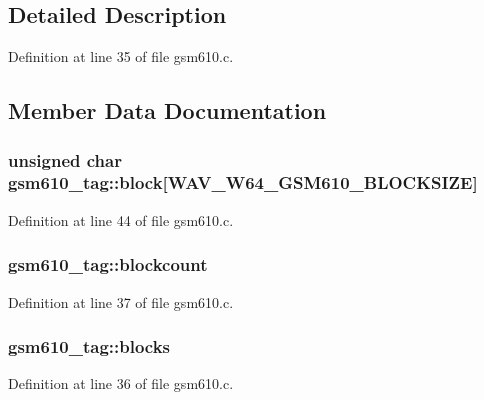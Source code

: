 \subsection{Detailed Description}


Definition at line 35 of file gsm610.\+c.



\subsection{Member Data Documentation}
\subsubsection[{\texorpdfstring{block}{block}}]{\setlength{\rightskip}{0pt plus 5cm}unsigned char gsm610\+\_\+tag\+::block\mbox{[}{\bf W\+A\+V\+\_\+\+W64\+\_\+\+G\+S\+M610\+\_\+\+B\+L\+O\+C\+K\+S\+I\+ZE}\mbox{]}}\hypertarget{structgsm610__tag_af3e75860abc54dbd4a065a40644076fa}{}\label{structgsm610__tag_af3e75860abc54dbd4a065a40644076fa}


Definition at line 44 of file gsm610.\+c.

\subsubsection[{\texorpdfstring{blockcount}{blockcount}}]{ gsm610\+\_\+tag\+::blockcount}\hypertarget{structgsm610__tag_a6d0a099e7b5af9354f5241725ece75ea}{}\label{structgsm610__tag_a6d0a099e7b5af9354f5241725ece75ea}


Definition at line 37 of file gsm610.\+c.

\subsubsection[{\texorpdfstring{blocks}{blocks}}]{ gsm610\+\_\+tag\+::blocks}\hypertarget{structgsm610__tag_ae0272ba41ab8053b6215e547e129d9a3}{}\label{structgsm610__tag_ae0272ba41ab8053b6215e547e129d9a3}


Definition at line 36 of file gsm610.\+c.

